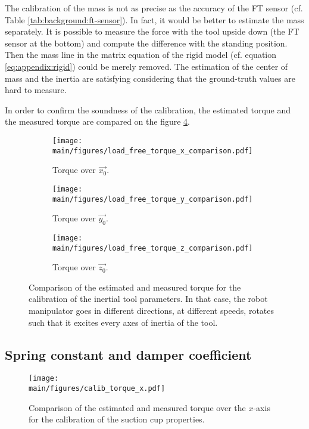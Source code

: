 \documentclass[/home/francois/latex/report/main.tex]{subfiles}
\begin{document}
The calibration of the mass is not as precise as the accuracy of the \ac{FT} sensor (cf. Table \ref{tab:background:ft-sensor}). In fact, it would be better to estimate the mass separately. It is possible to measure the force with the tool upside down (the \ac{FT} sensor at the bottom) and compute the difference with the standing position. Then the mass line in the matrix equation of the rigid model (cf. equation \ref{eq:appendix:rigid}) could be merely removed. The estimation of the center of mass and the inertia are satisfying considering that the ground-truth values are hard to measure.

In order to confirm the soundness of the calibration, the estimated torque and the measured torque are compared on the figure \ref{fig:results:calibration:torque}.

\begin{figure}[h]
\centering
\begin{subfigure}{0.49\textwidth}
\centering
\texttt{[image: \\main/figures/load\_free\_torque\_x\_comparison.pdf]}
\caption{Torque over $\overrightarrow{x_0}$.}
\label{fig:results:calibration:torque-x}
\end{subfigure}
\begin{subfigure}{0.49\textwidth}
\centering
\texttt{[image: \\main/figures/load\_free\_torque\_y\_comparison.pdf]}
\caption{Torque over $\overrightarrow{y_0}$.}
\label{fig:results:calibration:torque-y}
\end{subfigure}
\begin{subfigure}{0.51\textwidth}
\centering
\texttt{[image: \\main/figures/load\_free\_torque\_z\_comparison.pdf]}
\caption{Torque over $\overrightarrow{z_0}$.}
\label{fig:results:calibration:torque-z}
\end{subfigure}
\caption{Comparison of the estimated and measured torque for the calibration of the inertial tool parameters. In that case, the robot manipulator goes in different directions, at different speeds, rotates such that it excites every axes of inertia of the tool. \label{fig:results:calibration:torque}}
\end{figure}

\subsection{Spring constant and damper coefficient}

\begin{figure}[h]
  \centering
  \texttt{[image: \\main/figures/calib\_torque\_x.pdf]}
  \caption{Comparison of the estimated and measured torque over the $x$-axis for the calibration of the suction cup properties.}
  \label{fig:results:calibration:suction-torque-x}
\end{figure}
\end{document}
